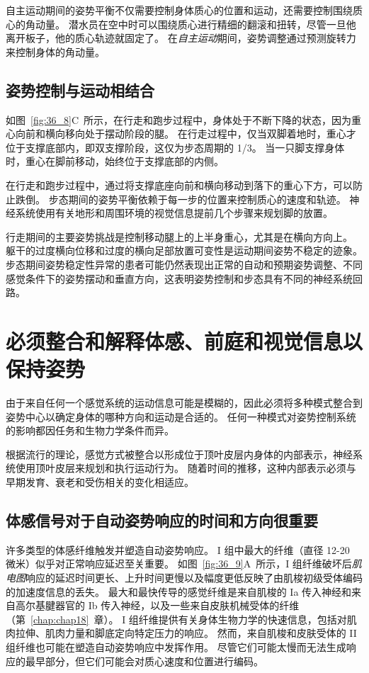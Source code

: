 自主运动期间的姿势平衡不仅需要控制身体质心的位置和运动，还需要控制围绕质心的角动量。
潜水员在空中时可以围绕质心进行精细的翻滚和扭转，尽管一旦他离开板子，他的质心轨迹就固定了。
在\textit{自主运动}期间，姿势调整通过预测旋转力来控制身体的角动量。



\subsection{姿势控制与运动相结合}

如图~\ref{fig:36_8}C~所示，在行走和跑步过程中，身体处于不断下降的状态，因为重心向前和横向移向处于摆动阶段的腿。
在行走过程中，仅当双脚着地时，重心才位于支撑底部内，即双支撑阶段，这仅为步态周期的 1/3。
当一只脚支撑身体时，重心在脚前移动，始终位于支撑底部的内侧。


在行走和跑步过程中，通过将支撑底座向前和横向移动到落下的重心下方，可以防止跌倒。
步态期间的姿势平衡依赖于每一步的位置来控制质心的速度和轨迹。
神经系统使用有关地形和周围环境的视觉信息提前几个步骤来规划脚的放置。


行走期间的主要姿势挑战是控制移动腿上的上半身重心，尤其是在横向方向上。
躯干的过度横向位移和过度的横向足部放置可变性是运动期间姿势不稳定的迹象。
步态期间姿势稳定性异常的患者可能仍然表现出正常的自动和预期姿势调整、不同感觉条件下的姿势摆动和垂直方向，这表明姿势控制和步态具有不同的神经系统回路。



\section{必须整合和解释体感、前庭和视觉信息以保持姿势}

由于来自任何一个感觉系统的运动信息可能是模糊的，因此必须将多种模式整合到姿势中心以确定身体的哪种方向和运动是合适的。
任何一种模式对姿势控制系统的影响都因任务和生物力学条件而异。


根据流行的理论，感觉方式被整合以形成位于顶叶皮层内身体的内部表示，神经系统使用顶叶皮层来规划和执行运动行为。
随着时间的推移，这种内部表示必须与早期发育、衰老和受伤相关的变化相适应。



\subsection{体感信号对于自动姿势响应的时间和方向很重要}

许多类型的体感纤维触发并塑造自动姿势响应。
I 组中最大的纤维（直径 12-20 微米）似乎对正常响应延迟至关重要。
如图~\ref{fig:36_9}A~所示，I 组纤维破坏后\textit{肌电图}响应的延迟时间更长、上升时间更慢以及幅度更低反映了由肌梭初级受体编码的加速度信息的丢失。
最大和最快传导的感觉纤维是来自肌梭的 Ia 传入神经和来自高尔基腱器官的 Ib 传入神经，以及一些来自皮肤机械受体的纤维（第~\ref{chap:chap18}~章）。
I 组纤维提供有关身体生物力学的快速信息，包括对肌肉拉伸、肌肉力量和脚底定向特定压力的响应。
然而，来自肌梭和皮肤受体的 II 组纤维也可能在塑造自动姿势响应中发挥作用。
尽管它们可能太慢而无法生成响应的最早部分，但它们可能会对质心速度和位置进行编码。


